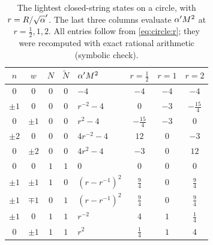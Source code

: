 \begin{table}[t]
\centering\setlength{\extrarowheight}{2.5pt}
\caption{The lightest closed-string states on a circle, with $r=R/\sqrt\ap$. The last three
columns evaluate $\alpha' M^2$ at $r=\frac12,1,2$. All entries follow from
\eqref{eq:circle:r}; they were recomputed with exact rational arithmetic (symbolic check).}
\label{tab:circle:states}
\smallskip
\begin{tabular}{@{}cccclccc@{}}
\toprule
$n$ & $w$ & $N$ & $\tilde N$ & $\alpha' M^2$ & $r=\frac12$ & $r=1$ & $r=2$\\
\midrule
$0$ & $0$ & $0$ & $0$ & $-4$ & $-4$ & $-4$ & $-4$\\
$\pm1$ & $0$ & $0$ & $0$ & $r^{-2}-4$ & $0$ & $-3$ & $-\frac{15}{4}$\\
$0$ & $\pm1$ & $0$ & $0$ & $r^{2}-4$ & $-\frac{15}{4}$ & $-3$ & $0$\\
$\pm2$ & $0$ & $0$ & $0$ & $4r^{-2}-4$ & $12$ & $0$ & $-3$\\
$0$ & $\pm2$ & $0$ & $0$ & $4r^{2}-4$ & $-3$ & $0$ & $12$\\
$0$ & $0$ & $1$ & $1$ & $0$ & $0$ & $0$ & $0$\\
$\pm1$ & $\pm1$ & $1$ & $0$ & $(r-r^{-1})^2$ & $\frac94$ & $0$ & $\frac94$\\
$\pm1$ & $\mp1$ & $0$ & $1$ & $(r-r^{-1})^2$ & $\frac94$ & $0$ & $\frac94$\\
$\pm1$ & $0$ & $1$ & $1$ & $r^{-2}$ & $4$ & $1$ & $\frac14$\\
$0$ & $\pm1$ & $1$ & $1$ & $r^{2}$ & $\frac14$ & $1$ & $4$\\
\bottomrule
\end{tabular}
\end{table}

